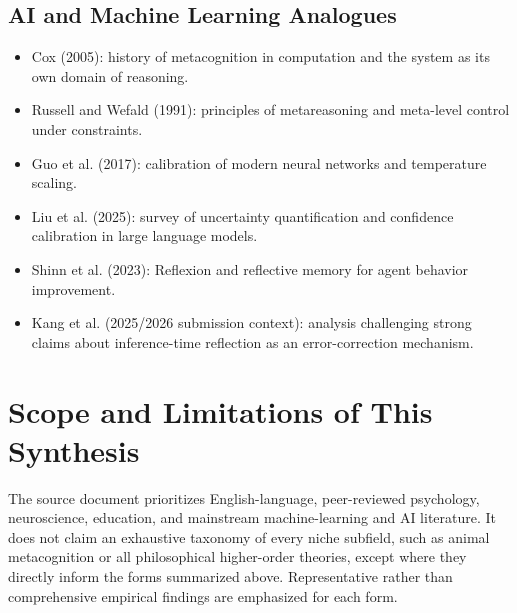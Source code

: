\documentclass[a4paper]{article}
\begin{document}
   \subsection{AI and Machine Learning Analogues}

   \begin{itemize}
      \item Cox (2005): history of metacognition in computation and the system as its own domain of reasoning.
      \item Russell and Wefald (1991): principles of metareasoning and meta-level control under constraints.
      \item Guo et al. (2017): calibration of modern neural networks and temperature scaling.
      \item Liu et al. (2025): survey of uncertainty quantification and confidence calibration in large language models.
      \item Shinn et al. (2023): Reflexion and reflective memory for agent behavior improvement.
      \item Kang et al. (2025/2026 submission context): analysis challenging strong claims about inference-time reflection as an error-correction mechanism.
   \end{itemize}

   \section{Scope and Limitations of This Synthesis}

   The source document prioritizes English-language, peer-reviewed psychology, neuroscience, education, and mainstream machine-learning and AI literature. It does not claim an exhaustive taxonomy of every niche subfield, such as animal metacognition or all philosophical higher-order theories, except where they directly inform the forms summarized above. Representative rather than comprehensive empirical findings are emphasized for each form.

   

   
\end{document}
